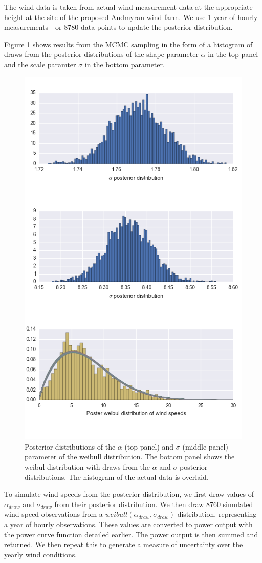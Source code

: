 \documentclass[11pt]{article}
\begin{document}
The wind data is taken from actual wind measurement data at the appropriate height at the site of the proposed Andmyran wind farm. We use 1 year of hourly measurements - or 8780 data points to update the posterior distribution. 

Figure \ref{posteriors} shows results from the MCMC sampling in the form of a histogram of draws from the posterior distributions of the shape parameter $\alpha$ in the top panel and the scale paramter $\sigma$ in the bottom parameter.

\begin{figure}
	\centering
	\includegraphics[width=.6\textwidth]{figures/posteriors.png}
	\caption{Posterior distributions of the $\alpha$ (top panel) and $\sigma$ (middle panel) parameter of the weibull distribution. The bottom panel shows the weibul distribution with draws from the $\alpha$ and $\sigma$ posterior distributions. The histogram of the actual data is overlaid.}
	\label{posteriors}
\end{figure}

To simulate wind speeds from the posterior distribution, we first draw values of $\alpha_{draw}$ and $\sigma_{draw}$ from their posterior distribution. We then draw 8760 simulated wind speed observations from a $weibull(\alpha_{draw}, \sigma_{draw})$ distribution, representing a year of hourly observations. These values are converted to power output with the power curve function detailed earlier. The power output is then summed and returned. We then repeat this to generate a measure of uncertainty over the yearly wind conditions.
\end{document}
